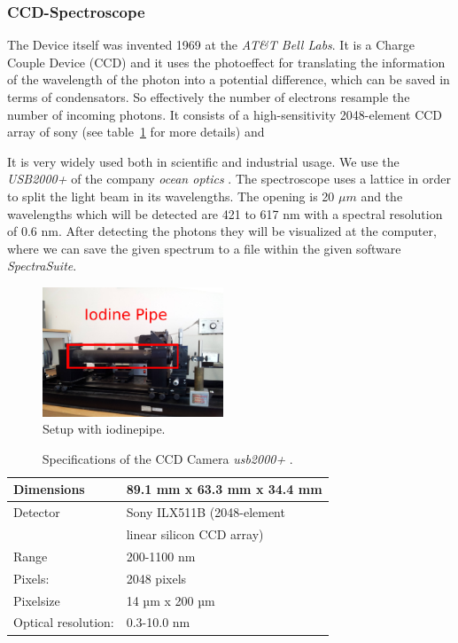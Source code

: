 \subsubsection{CCD-Spectroscope}
The Device itself was invented 1969 at the 
\textit{AT\&T Bell Labs}. It is a Charge Couple Device (CCD) and it uses
the photoeffect for translating the information of the wavelength
of the photon into a potential difference, which can be saved
in terms of condensators. So effectively the number of electrons
resample the number of incoming photons.
It consists of a high-sensitivity 2048-element CCD array of sony 
(see table~\ref{tab:ccd} for more details) and 


It is very widely used
both in scientific and industrial usage.
We use the \textit{USB2000+} of the company \textit{ocean optics}
\cite{versuchsanleitung}. The spectroscope uses a lattice in order
to split the light beam in its wavelengths. 
The opening is 20 $\mu m$ and the wavelengths which will be
detected are 421 to 617 nm with a spectral resolution of 0.6 nm.
After detecting 
the photons they will be visualized at the computer, where we
can save the given spectrum to a file within the given software
\textit{SpectraSuite}.
\begin{figure}
\caption{Setup with iodinepipe.} 
  \begin{center}
    \includegraphics[width=0.48\textwidth]{pics/const2}
  \end{center}
 \label{fig:const2}
  \vspace{+10pt}
\end{figure}

\begin{table}
    \caption{Specifications of the  CCD Camera \textit{usb2000+} \cite{usb2000_site}.}
\begin{tabular}{| l | l |}
    \hline
    Dimensions & 89.1 mm x 63.3 mm x 34.4 mm \\ 
    \hline
    Detector & Sony ILX511B (2048-element \\
             & linear silicon CCD array) \\  
    \hline
    Range & 200-1100 nm \\ 
    \hline
    Pixels: & 2048 pixels \\ 
    \hline
    Pixelsize & 14 µm x 200 µm \\ 
    \hline
    Optical resolution: & 0.3-10.0 nm \\ 
    \hline
\end{tabular}
\label{tab:ccd}
\end{table}


